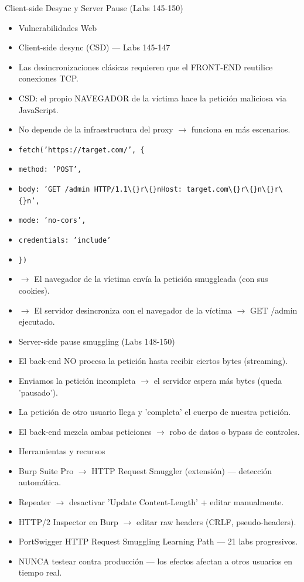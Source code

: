\documentclass[aspectratio=169,10pt]{beamer}
\newcommand{\cmd}[1]{\texttt{\color{uznavy}#1}}
\begin{document}
\begin{frame}[allowframebreaks]{Client-side Desync y Server Pause (Labs 145-150)}
\small
  \begin{itemize}
  \item Vulnerabilidades Web
  \item Client-side desync (CSD) --- Labs 145-147
  \item Las desincronizaciones clásicas requieren que el FRONT-END reutilice conexiones TCP.
  \item CSD: el propio NAVEGADOR de la víctima hace la petición maliciosa via JavaScript.
  \item No depende de la infraestructura del proxy $\rightarrow$ funciona en más escenarios.
  \item \cmd{fetch('https://target.com/', \{}
  \item \cmd{method: 'POST',}
  \item \cmd{body: 'GET /admin HTTP/1.1\textbackslash\{\}r\textbackslash\{\}nHost: target.com\textbackslash\{\}r\textbackslash\{\}n\textbackslash\{\}r\textbackslash\{\}n',}
  \item \cmd{mode: 'no-cors',}
  \item \cmd{credentials: 'include'}
  \item \cmd{\})}
  \item $\rightarrow$ El navegador de la víctima envía la petición smuggleada (con sus cookies).
  \item $\rightarrow$ El servidor desincroniza con el navegador de la víctima $\rightarrow$ GET /admin ejecutado.
  \item Server-side pause smuggling (Labs 148-150)
  \item El back-end NO procesa la petición hasta recibir ciertos bytes (streaming).
  \item Enviamos la petición incompleta $\rightarrow$ el servidor espera más bytes (queda 'pausado').
  \item La petición de otro usuario llega y 'completa' el cuerpo de nuestra petición.
  \item El back-end mezcla ambas peticiones $\rightarrow$ robo de datos o bypass de controles.
  \item Herramientas y recursos
  \item Burp Suite Pro $\rightarrow$ HTTP Request Smuggler (extensión) --- detección automática.
  \item Repeater $\rightarrow$ desactivar 'Update Content-Length' + editar manualmente.
  \item HTTP/2 Inspector en Burp $\rightarrow$ editar raw headers (CRLF, pseudo-headers).
  \item PortSwigger HTTP Request Smuggling Learning Path --- 21 labs progresivos.
  \item NUNCA testear contra producción --- los efectos afectan a otros usuarios en tiempo real.
  \end{itemize}
\end{frame}
\end{document}
